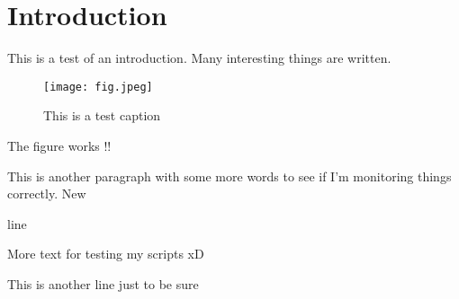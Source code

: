 \chapter{Introduction}
\label{ch:intro}

This is a test of an introduction. Many interesting things are written.

\begin{figure}[h]
	\centering
	\texttt{[image: fig.jpeg]}
	\caption{This is a test caption}
	\label{fig:testfig}
\end{figure}

The figure works !! \cite{feynman2018space}

This is another paragraph with some more words to see if I'm monitoring things correctly. New

line

More text for testing my scripts xD

This is another line just to be sure
